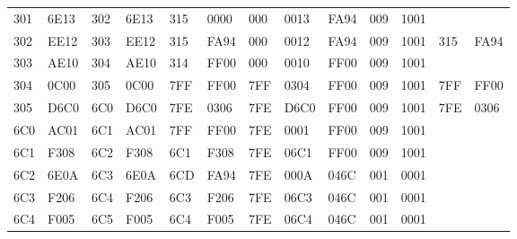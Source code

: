 \documentclass[14pt]{extreport}
\begin{document}
\begin{landscape}
\begin{table}[!h]
\begin{tabular}{|l|l|l|l|l|l|l|l|l|l|l|l|l|}
                    301 & 6E13 & 302 & 6E13 & 315 & 0000 & 000 & 0013 & FA94 & 009 & 1001&& \\
                    302 & EE12 & 303 & EE12 & 315 & FA94 & 000 & 0012 & FA94 & 009 & 1001 & 315 & FA94 \\
                    303 & AE10 & 304 & AE10 & 314 & FF00 & 000 & 0010 & FF00 & 009 & 1001 &&\\
                    304 & 0C00 & 305 & 0C00 & 7FF & FF00 & 7FF & 0304 & FF00 & 009 & 1001 & 7FF & FF00 \\
                    305 & D6C0 & 6C0 & D6C0 & 7FE & 0306 & 7FE & D6C0 & FF00 & 009 & 1001 & 7FE & 0306 \\
                    6C0 & AC01 & 6C1 & AC01 & 7FF & FF00 & 7FE & 0001 & FF00 & 009 & 1001 &&\\
                    6C1 & F308 & 6C2 & F308 & 6C1 & F308 & 7FE & 06C1 & FF00 & 009 & 1001 &&\\
                    6C2 & 6E0A & 6C3 & 6E0A & 6CD & FA94 & 7FE & 000A & 046C & 001 & 0001 &&\\
                    6C3 & F206 & 6C4 & F206 & 6C3 & F206 & 7FE & 06C3 & 046C & 001 & 0001 &&\\
                    6C4 & F005 & 6C5 & F005 & 6C4 & F005 & 7FE & 06C4 & 046C & 001 & 0001 &&\\
                    \hline
                \end{tabular}


\end{table}
\end{landscape}
\end{document}

